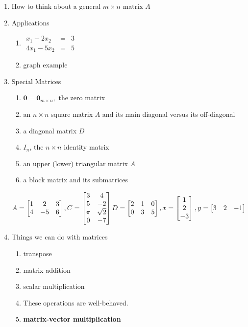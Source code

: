 \documentclass[11pt,fleqn]{article}
\newcommand{\bbm}{\begin{bmatrix}}
\newcommand{\ebm}{\end{bmatrix}}
\def\vecthree#1#2#3{\begin{bmatrix}#1\\#2\\#3\end{bmatrix}}
\begin{document}
\begin{enumerate}
\item How to think about a general $m \times n$ matrix $A$
\vspace{2in}
\item Applications
	\begin{enumerate}
	\item $\begin{matrix} x_1+2x_2&=&3\\ 4x_1-5x_2&=&5 \end{matrix}$\\
	\vfill
	\item graph example\\
	
	\end{enumerate}
	\vfill
\newpage

\item Special Matrices
	\begin{enumerate}
	\item $\textbf{0}=\textbf{0}_{m \times n},$ the zero matrix
	\vfill
	\item an $n \times n$ square matrix $A$ and its main diagonal versus its off-diagonal 
	\vfill
	\item a diagonal matrix $D$ 
	\vfill
	\item $I_n$, the $n \times n$ identity matrix
	\vfill
	\item an upper (lower) triangular matrix $A$ 
	\vfill
	\item a block matrix and its submatrices
	\vfill
	\end{enumerate}
\newpage
$A=\bbm 1&2&3\\4&-5&6 \ebm,  \hfill C= \bbm 3&4\\5&-2\\ \pi& \sqrt{2}\\0&-7 \ebm\hfill D=\bbm 2&1&0\\ 0&3&5 \ebm,  \hfill x=\vecthree 1 2 {-3}, \hfill y= \bbm 3 & 2& {-1} \ebm$
\item Things we can do with matrices
	\begin{enumerate}
	\item transpose
	\vfill
	\item matrix addition
	\vfill
	\item scalar multiplication
	\vfill
	\item These operations are well-behaved.
	\vfill
\newpage
	\item \textbf{matrix-vector multiplication}
	\vfill
	\end{enumerate}
\end{enumerate}
\end{document}
